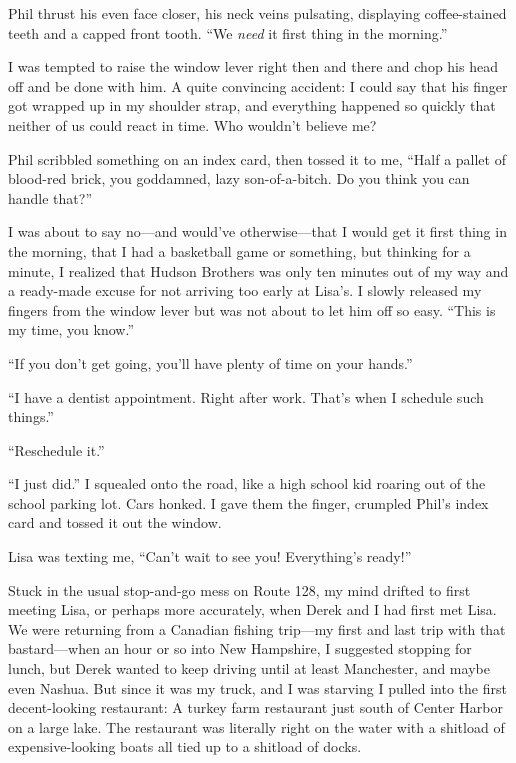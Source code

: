 Phil thrust his even face closer, his neck veins pulsating, displaying
coffee-stained teeth and a capped front tooth. ``We \emph{need} it first
thing in the morning.''

I was tempted to raise the window lever right then and there and chop
his head off and be done with him. A quite convincing accident: I could
say that his finger got wrapped up in my shoulder strap, and everything
happened so quickly that neither of us could react in time. Who wouldn't
believe me?

Phil scribbled something on an index card, then tossed it to me, ``Half
a pallet of blood-red brick, you goddamned, lazy son-of-a-bitch. Do you
think you can handle that?''

I was about to say no---and would've otherwise---that I would get it
first thing in the morning, that I had a basketball game or something,
but thinking for a minute, I realized that Hudson Brothers was only ten
minutes out of my way and a ready-made excuse for not arriving too early
at Lisa's. I slowly released my fingers from the window lever but was
not about to let him off so easy. ``This is my time, you know.''

``If you don't get going, you'll have plenty of time on your hands.''

``I have a dentist appointment. Right after work. That's when I schedule
such things.''

``Reschedule it.''

``I just did.'' I squealed onto the road, like a high school kid roaring
out of the school parking lot. Cars honked. I gave them the finger,
crumpled Phil's index card and tossed it out the window.

Lisa was texting me, ``Can't wait to see you! Everything's ready!''

Stuck in the usual stop-and-go mess on Route 128, my mind drifted to
first meeting Lisa, or perhaps more accurately, when Derek and I had
first met Lisa. We were returning from a Canadian fishing trip---my
first and last trip with that bastard---when an hour or so into New
Hampshire, I suggested stopping for lunch, but Derek wanted to keep
driving until at least Manchester, and maybe even Nashua. But since it
was my truck, and I was starving I pulled into the first decent-looking
restaurant: A turkey farm restaurant just south of Center Harbor on a
large lake. The restaurant was literally right on the water with a
shitload of expensive-looking boats all tied up to a shitload of docks.

